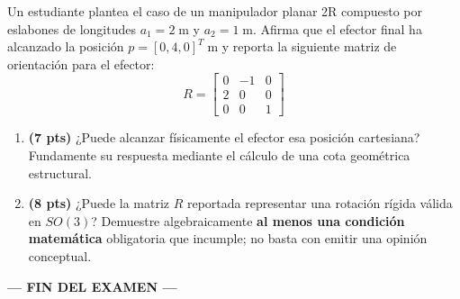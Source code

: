 \documentclass[11pt, a4paper]{article}
\begin{document}
Un estudiante plantea el caso de un manipulador planar 2R compuesto por eslabones de longitudes $a_1 = 2\;\mathrm{m}$ y $a_2 = 1\;\mathrm{m}$. Afirma que el efector final ha alcanzado la posición $p = [0, 4, 0]^T\;\mathrm{m}$ y reporta la siguiente matriz de orientación para el efector:
\begin{equation*}
    R = \begin{bmatrix} 0 & -1 & 0 \\ 2 & 0 & 0 \\ 0 & 0 & 1 \end{bmatrix} \text{}
\end{equation*}

\begin{enumerate}
    \item \textbf{(7 pts)} ¿Puede alcanzar físicamente el efector esa posición cartesiana? Fundamente su respuesta mediante el cálculo de una cota geométrica estructural.
    \item \textbf{(8 pts)} ¿Puede la matriz $R$ reportada representar una rotación rígida válida en $SO(3)$? Demuestre algebraicamente \textbf{al menos una condición matemática} obligatoria que incumple; no basta con emitir una opinión conceptual.
\end{enumerate}

\begin{center}
    \textbf{--- FIN DEL EXAMEN ---}
\end{center}
\end{document}
